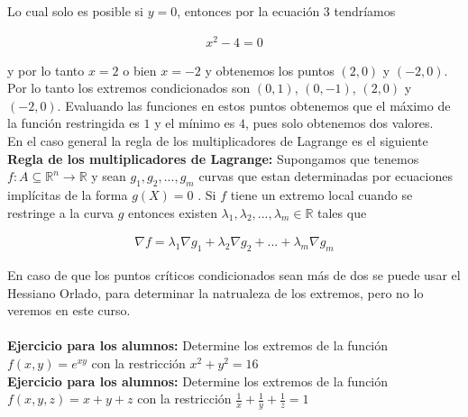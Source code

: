 \documentclass{article}
\theoremstyle{definition}
\begin{document}
Lo cual solo es posible si $y=0$, entonces por la ecuación 3 tendríamos

\begin{align*}
 x^2-4=0
\end{align*}

y por lo tanto $x=2$ o bien $x=-2$ y obtenemos los puntos $(2,0)$ y $(-2,0)$. Por lo tanto los extremos condicionados son $(0,1)$, $(0,-1)$, $(2,0)$ y $(-2,0)$. Evaluando las funciones en estos puntos obtenemos que el máximo de la función restringida es $1$ y el mínimo es $4$, pues solo obtenemos dos valores. \\



En el caso general la regla de los multiplicadores de Lagrange es el siguiente \\

\textbf{Regla de los multiplicadores de Lagrange: } Supongamos que tenemos $f: A \subseteq \mathbb{R}^n \to \mathbb{R}$ y sean $g_1,g_2,...,g_m$ curvas que estan determinadas por ecuaciones implícitas de la forma $g(X)=0$ . Si $f$ tiene un extremo local cuando se restringe a la curva $g$ entonces existen $\lambda_1,\lambda_2,... ,\lambda_m \in \mathbb{R}$ tales que

\begin{align*}
    \nabla f = \lambda_1 \nabla g_1 +\lambda_2 \nabla g_2 + ... + \lambda_m \nabla g_m
\end{align*}


En caso de que los puntos críticos condicionados sean más de dos se puede usar el Hessiano Orlado, para determinar la natrualeza de los extremos, pero no lo veremos en este curso. \\ \\


\textbf{Ejercicio para los alumnos: } Determine  los extremos de la funci\'on $f(x,y) = e^{xy}$ con la restricci\'on $x^2+y^2=16$ \\

\textbf{Ejercicio para los alumnos: } Determine  los extremos de la funci\'on $f(x,y,z) = x+y+z$ con la restricci\'on $\frac{1}{x}+\frac{1}{y}+\frac{1}{z} = 1$ \\
\end{document}
